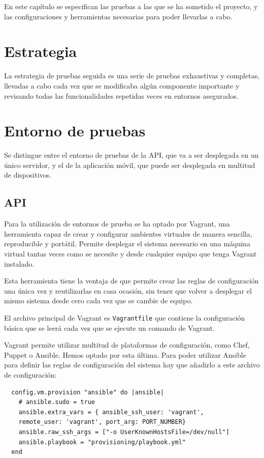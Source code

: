 En este capítulo se especifican las pruebas a las que se ha sometido el proyecto,
y las configuraciones y herramientas necesarias para poder llevarlas a cabo.

\section{Estrategia}

La estrategia de pruebas seguida es una serie de pruebas exhaustivas y
completas, llevadas a cabo cada vez que se modificaba algún componente
importante y revisando todas las funcionalidades repetidas veces en entornos
asegurados.

\section{Entorno de pruebas}

Se distingue entre el entorno de pruebas de la API, que va a ser desplegada en
un único servidor, y el de la aplicación móvil, que puede ser desplegada en
multitud de dispositivos.

\subsection{API}

Para la utilización de entornos de prueba se ha optado por Vagrant, una
herramienta capaz de crear y configurar ambientes virtuales de manera sencilla,
reproducible y portátil. Permite desplegar el sistema necesario en una máquina
virtual tantas veces como se necesite y desde cualquier equipo que tenga Vagrant
instalado.

Esta herramienta tiene la ventaja de que permite crear las reglas de
configuración una única vez y reutilizarlas en casa ocasión, sin tener que volver
a desplegar el mismo sistema desde cero cada vez que se cambie de equipo.

El archivo principal de Vagrant es \texttt{Vagrantfile} que contiene la
configuración básica que se leerá cada vez que se ejecute un comando de Vagrant.

Vagrant permite utilizar multitud de plataformas de configuración, como Chef,
Puppet o Ansible. Hemos optado por esta última. Para poder utilizar Ansible para
definir las reglas de configuración del sistema hay que añadirlo a este archivo
de configuración:

\begin{verbatim}
  config.vm.provision "ansible" do |ansible|
    # ansible.sudo = true
    ansible.extra_vars = { ansible_ssh_user: 'vagrant',
    remote_user: 'vagrant', port_arg: PORT_NUMBER}
    ansible.raw_ssh_args = ["-o UserKnownHostsFile=/dev/null"]
    ansible.playbook = "provisioning/playbook.yml"
  end
\end{verbatim}

